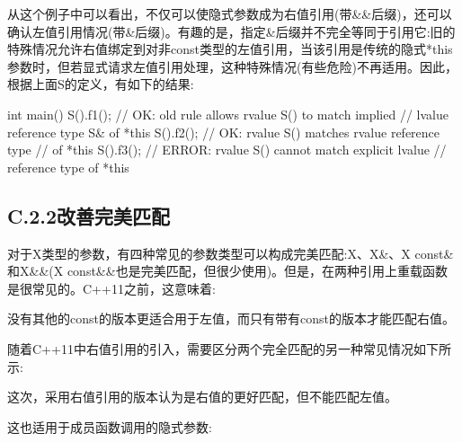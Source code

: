 从这个例子中可以看出，不仅可以使隐式参数成为右值引用(带\&\&后缀)，还可以确认左值引用情况(带\&后缀)。有趣的是，指定\&后缀并不完全等同于引用它:旧的特殊情况允许右值绑定到对非const类型的左值引用，当该引用是传统的隐式*this参数时，但若显式请求左值引用处理，这种特殊情况(有些危险)不再适用。因此，根据上面S的定义，有如下的结果:

\begin{cpp}
int main()
{
	S().f1(); // OK: old rule allows rvalue S() to match implied
			// lvalue reference type S& of *this
	S().f2(); // OK: rvalue S() matches rvalue reference type
			// of *this
	S().f3(); // ERROR: rvalue S() cannot match explicit lvalue
			// reference type of *this
}
\end{cpp}


\subsection{C.2.2\hspace{0.2cm}改善完美匹配}

对于X类型的参数，有四种常见的参数类型可以构成完美匹配:X、X\&、X const\&和X\&\&(X const\&\&也是完美匹配，但很少使用)。但是，在两种引用上重载函数是很常见的。C++11之前，这意味着:


没有其他的const的版本更适合用于左值，而只有带有const的版本才能匹配右值。

随着C++11中右值引用的引入，需要区分两个完全匹配的另一种常见情况如下所示:


这次，采用右值引用的版本认为是右值的更好匹配，但不能匹配左值。

这也适用于成员函数调用的隐式参数:


